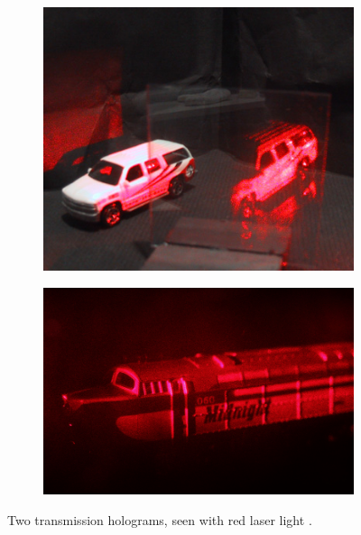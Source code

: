 \documentclass[12pt]{article}
\begin{document}
\begin{figure}[H]
    \centering
    \begin{subfigure}[b]{.338\textwidth}
        \centering
        \includegraphics[width=\linewidth]{transmission holo.jpg}
    \end{subfigure}
    \hspace{-.5em}
    \begin{subfigure}[b]{.43\textwidth}
        \centering
        \includegraphics[width=\linewidth]{trans 2 holo.jpg}
    \end{subfigure}
    \caption{\centering Two transmission holograms, seen with red laser light \protect\cite{transholo,reftransholo}.}
    \label{fig:7}
\end{figure}
\end{document}
